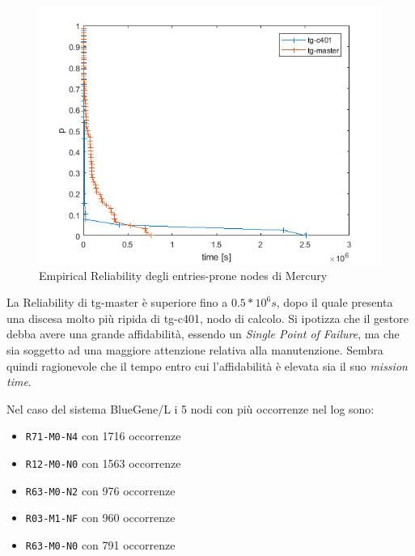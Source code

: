 		\begin{figure}[H]
			\centering
			\includegraphics[scale=0.7]{./immagine/nodiMrel.png}
			\caption{Empirical Reliability degli entries-prone nodes di Mercury}
			\label{fig:ffda-nMrel}
		\end{figure}
		
		La Reliability di tg-master è superiore fino a $0.5*10^{6}s$, dopo il quale presenta una discesa molto più ripida di tg-c401, nodo di calcolo. Si ipotizza che il gestore debba avere una grande affidabilità, essendo un \emph{Single Point of Failure}, ma che sia soggetto ad una maggiore attenzione relativa alla manutenzione. Sembra quindi ragionevole che il tempo entro cui l'affidabilità è elevata sia il suo \emph{mission time}.\par
		
		Nel caso del sistema BlueGene/L i 5 nodi con più occorrenze nel log sono:
		\begin{itemize}
			\item \texttt{R71-M0-N4} con 1716 occorrenze
			\item \texttt{R12-M0-N0} con 1563 occorrenze
			\item \texttt{R63-M0-N2} con 976 occorrenze
			\item \texttt{R03-M1-NF} con 960 occorrenze
			\item \texttt{R63-M0-N0} con 791 occorrenze
		\end{itemize}
	
